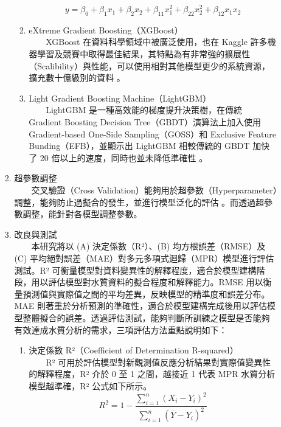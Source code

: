 \documentclass[12pt,a4paper]{article}
\begin{document}
\begin{enumerate}
\begin{enumerate}[label=\arabic*.]
\begin{enumerate}[label=2-2-\arabic*.]
\begin{enumerate}[label=\Alph*.]
                    \begin{equation}
                        y = \beta_0 + \beta_1 x_1 + \beta_2 x_2 + \beta_{11} x_1^2 + \beta_{22} x_2^2 + \beta_{12} x_1 x_2
                    \end{equation}
                \item eXtreme Gradient Boosting（XGBoost）\\
                　　XGBoost 在資料科學領域中被廣泛使用，也在 Kaggle 許多機器學習及競賽中取得最佳結果，其特點為有非常強的擴展性（Scalibility）與性能，可以使用相對其他模型更少的系統資源，擴充數十億級別的資料 \cite{ref9}。
                \item Light Gradient Boosting Machine（LightGBM）\\
                　　LightGBM 是一種高效能的梯度提升決策樹，在傳統 Gradient Boosting Decision Tree（GBDT）演算法上加入使用 Gradient-based One-Side Sampling（GOSS）和 Exclusive Feature Bunding（EFB），並顯示出 LightGBM 相較傳統的 GBDT 加快了 20 倍以上的速度，同時也並未降低準確性 \cite{ref10}。
            \end{enumerate}
        \item 超參數調整\\
        　　交叉驗證（Cross Validation）能夠用於超參數（Hyperparameter）調整，能夠防止過擬合的發生，並進行模型泛化的評估 \cite{ref34}。而透過超參數調整，能針對各模型調整參數。
        \item 改良與測試\\
        　　本研究將以 (A) 決定係數（R²）、(B) 均方根誤差（RMSE）及 (C) 平均絕對誤差（MAE）對多元多項式迴歸（MPR）模型進行評估測試。R² 可衡量模型對資料變異性的解釋程度，適合於模型建構階段，用以評估模型對水質資料的擬合程度和解釋能力。RMSE 用以衡量預測值與實際值之間的平均差異，反映模型的精準度和誤差分布。MAE 則著重於分析預測的準確性，適合於模型建構完成後用以評估模型整體擬合的誤差。透過評估測試，能夠判斷所訓練之模型是否能夠有效達成水質分析的需求，三項評估方法重點說明如下：
            \begin{enumerate}[label=\Alph*.]
                \item 決定係數 R²（Coefficient of Determination R-squared）\\
                　　R² 可用於評估模型對新觀測值反應分析結果對實際值變異性的解釋程度，R² 介於 0 至 1 之間，越接近 1 代表 MPR 水質分析模型越準確，R² 公式如下所示。
                    \begin{equation}
                    R^2 = 1 - \frac{\sum_{i=1}^n (X_i - Y_i)^2}{\sum_{i=1}^n (\overline{Y} - Y_i)^2}
                    \end{equation}

\end{enumerate}
\end{enumerate}
\end{enumerate}
\end{enumerate}
\end{document}
